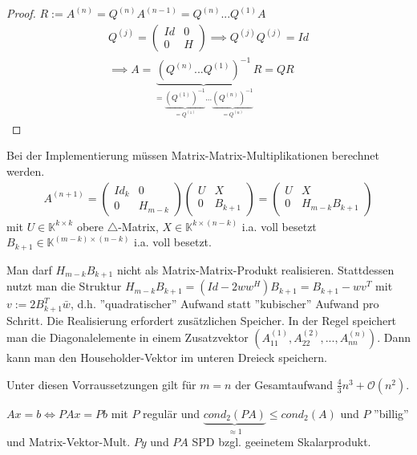 \begin{proof}
	$R := A^{(n)} = Q^{(n)}A^{(n-1)} = Q^{(n)} ... Q^{(1)}A$
	\begin{align*}
		Q^{(j)} = \left(\begin{matrix}
			Id & 0\\
			0 & H
		\end{matrix}\right) \implies Q^{(j)} Q^{(j)} = Id\\
		\implies A = \underbrace{(Q^{(n)} ... Q^{(1)})^{-1}}_{=\underbrace{(Q^{(1)})^{-1}}_{=Q^{(1)}} ... \underbrace{(Q^{(n)})^{-1}}_{=Q^{(n)}}}R = QR
	\end{align*}
\end{proof}

\begin{remark}
	Bei der Implementierung müssen Matrix-Matrix-Multiplikationen berechnet werden.
	\begin{align*}
		A^{(n+1)} = \left(\begin{matrix}
			Id_k & 0\\
			0 & H_{m-k}
		\end{matrix}\right)\left(\begin{matrix}
			U & X\\
			0 & B_{k+1}
		\end{matrix}\right) = \left(\begin{matrix}
			U & X\\
			0 & H_{m-k}B_{k+1}
		\end{matrix}\right)
	\end{align*}
	mit $U \in \mathbb{K}^{k\times k}$ obere $\triangle$-Matrix, $X \in \mathbb{K}^{k\times (n-k)}$ i.a. voll besetzt $B_{k+1} \in \mathbb{K}^{(m-k)\times (n-k)}$ i.a. voll besetzt.
	
	Man darf $H_{m-k}B_{k+1}$ nicht als Matrix-Matrix-Produkt realisieren. Stattdessen nutzt man die Struktur $H_{m-k}B_{k+1} = (Id - 2ww^H)B_{k+1} = B_{k+1} - wv^T$ mit $v := 2 B_{k+1}^T \bar{w}$, d.h. ''quadratischer'' Aufwand statt ''kubischer'' Aufwand pro Schritt. Die Realisierung erfordert zusätzlichen Speicher. In der Regel speichert man die Diagonalelemente in einem Zusatzvektor $(A_{11}^{(1)}, A_{22}^{(2)}, ..., A_{nn}^{(n)})$. Dann kann man den Householder-Vektor im unteren Dreieck speichern.
	
	Unter diesen Vorraussetzungen gilt für $m=n$ der Gesamtaufwand $\frac{4}{3} n^3 + \mathcal{O}(n^2)$.
\end{remark}

$Ax=b \iff PAx = Pb$ mit $P$ regulär und $\underbrace{cond_2(PA)}_{\approx 1} \leq cond_2(A)$ und $P$ ''billig'' und Matrix-Vektor-Mult. $Py$ und $PA$ SPD bzgl. geeinetem Skalarprodukt.

